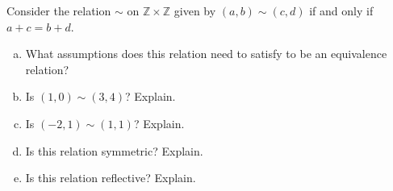 \documentclass[11pt,letterpaper]{article}
\begin{document}

 Consider the relation $\sim$ on $\mathbb{Z} \times \mathbb{Z}$ given by $(a, b) \sim (c, d)$ if and only if $a + c= b + d$.
	\begin{enumerate}[(a)]
	\item What assumptions does this relation need to satisfy to be an equivalence relation? 
	\item Is $(1, 0) \sim (3,4)$? Explain. 
	\item Is $(-2, 1) \sim (1, 1)$? Explain. 
	\item Is this relation symmetric? Explain. 
	\item Is this relation reflective? Explain. 
	\end{enumerate} \pspace
\end{document}
